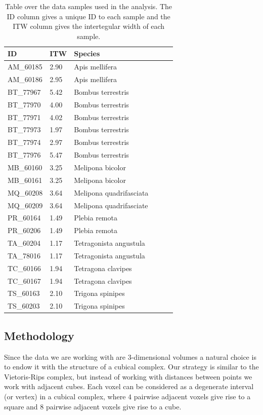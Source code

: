 \begin{table}[h]
\begin{center}
\begin{tabular}{*6l}
\toprule
  ID & ITW & Species  \\ \midrule
AM\_60185 & 2.90 & Apis mellifera \\
AM\_60186 & 2.95 & Apis mellifera \\
BT\_77967 & 5.42 & Bombus terrestris \\
BT\_77970 & 4.00 & Bombus terrestris \\
BT\_77971 & 4.02 & Bombus terrestris \\
BT\_77973 & 1.97 & Bombus terrestris \\
BT\_77974 & 2.97 & Bombus terrestris \\
BT\_77976 & 5.47 & Bombus terrestris \\
MB\_60160 & 3.25 & Melipona bicolor \\
MB\_60161 & 3.25 & Melipona bicolor \\
MQ\_60208 & 3.64 & Melipona quadrifasciata \\
MQ\_60209 & 3.64 & Melipona quadrifasciate \\
PR\_60164 & 1.49 & Plebia remota \\
PR\_60206 & 1.49 & Plebia remota \\
TA\_60204 & 1.17 & Tetragonista angustula \\
TA\_78016 & 1.17 & Tetragonista angustula \\
TC\_60166 & 1.94 & Tetragona clavipes \\
TC\_60167 & 1.94 & Tetragona clavipes \\
TS\_60163 & 2.10 & Trigona spinipes \\
TS\_60203 & 2.10 & Trigona spinipes \\
  \bottomrule
\end{tabular}
\caption{Table over the data samples used in the analysis. The ID column gives a unique ID to each sample and the ITW column gives the intertegular width of each sample.}
\label{bees}
\end{center}
\end{table}
\subsection{Methodology}
Since the data we are working with are 3-dimensional volumes a natural choice is to endow it with the structure of a cubical complex. Our strategy is similar to the Vietoris-Rips complex, but instead of working with distances between points we work with adjacent cubes. Each voxel can be considered as a degenerate interval (or vertex) in a cubical complex, where $4$ pairwise adjacent voxels give rise to a square and $8$ pairwise adjacent voxels give rise to a cube.

